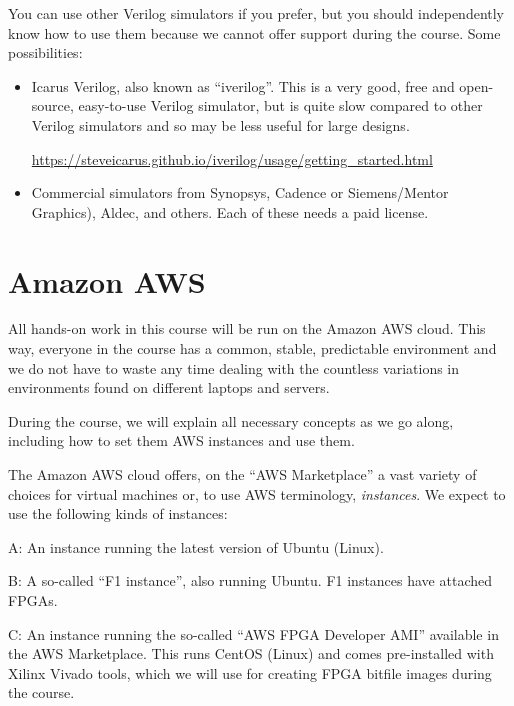 You can use other Verilog simulators if you prefer, but you should
independently know how to use them because we cannot offer support
during the course.  Some possibilities:

\begin{itemize}

  \item Icarus Verilog, also known as ``iverilog''.  This is a very
    good, free and open-source, easy-to-use Verilog simulator, but is
   quite slow compared to other Verilog simulators and so may be less
    useful for large designs.

    \url{https://steveicarus.github.io/iverilog/usage/getting_started.html}

  \item Commercial simulators from Synopsys, Cadence or Siemens/Mentor
    Graphics), Aldec, and others.  Each of these needs a paid license.

\end{itemize}


\section{Amazon AWS}

\label{sec_AWS}

All hands-on work in this course will be run on the Amazon AWS cloud.
This way, everyone in the course has a common, stable, predictable
environment and we do not have to waste any time dealing with the
countless variations in environments found on different laptops and
servers.

During the course, we will explain all necessary concepts as we go
along, including how to set them AWS instances and use them.

The Amazon AWS cloud offers, on the ``AWS Marketplace'' a vast variety
of choices for virtual machines or, to use AWS terminology,
\emph{instances}.  We expect to use the following kinds of instances:

\begin{tightlist}

  \item[A:] An instance running the latest version of Ubuntu (Linux).

  \item[B:] A so-called ``F1 instance'', also running Ubuntu.  F1
    instances have attached FPGAs.

  \item[C:] An instance running the so-called ``AWS FPGA Developer
    AMI'' available in the AWS Marketplace.  This runs CentOS (Linux)
    and comes pre-installed with Xilinx Vivado tools, which we will
    use for creating FPGA bitfile images during the course.

\end{tightlist}

